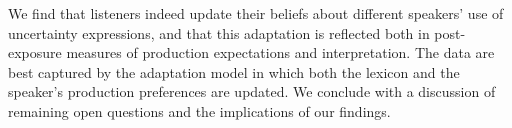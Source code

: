 \documentclass[lucida,biblatex]{sp} %
\begin{document}
We find that listeners indeed update their beliefs about different  speakers' use of uncertainty expressions, and that this adaptation is reflected both in post-exposure measures of production expectations and interpretation. The data are best captured by the adaptation model in which both the lexicon and the speaker's production preferences are updated. We conclude with a discussion of remaining open questions and the implications of our findings.



%
%
%
\end{document}
